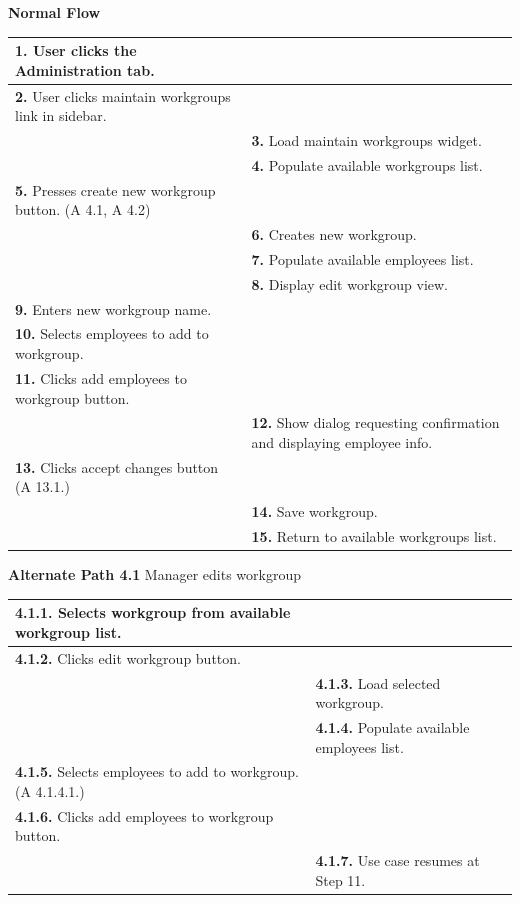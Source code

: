 \documentclass[letterpaper,12pt]{report}
\begin{document}
{ \centering \textbf{Normal Flow}
\begin{center}
\xuchead
\begin{tabular}{| p{8.5cm} | p{8.5cm} |}
\hline
\textbf{1.} User clicks the Administration tab. & \\
\hline
\textbf{2.} User clicks maintain workgroups link in sidebar. & \\
\hline
& \textbf{3.} Load maintain workgroups widget. \\
\hline
& \textbf{4.} Populate available workgroups list. \\
\hline
\textbf{5.} Presses create new workgroup button. (A 4.1, A 4.2) & \\
\hline
& \textbf{6.} Creates new workgroup. \\
\hline
& \textbf{7.} Populate available employees list. \\
\hline
& \textbf{8.} Display edit workgroup view. \\
\hline
\textbf{9.} Enters new workgroup name. \\
\hline
\textbf{10.} Selects employees to add to workgroup. & \\
\hline
\textbf{11.}  Clicks add employees to workgroup button. & \\
\hline
& \textbf{12.} Show dialog requesting confirmation and displaying employee info. \\
\hline
\textbf{13.} Clicks accept changes button (A 13.1.) & \\
\hline
& \textbf{14.} Save workgroup. \\
\hline
& \textbf{15.} Return to available workgroups list. \\
\hline
\end{tabular}
\end{center}

\pagebreak

\centering \textbf{Alternate Path 4.1}
\linebreak Manager edits workgroup
\begin{center}
\xuchead
\begin{tabular}{| p{8.5cm} | p{8.5cm} |}
\hline
\textbf{4.1.1.} Selects workgroup from available workgroup list. & \\
\hline
\textbf{4.1.2.} Clicks edit workgroup button. & \\
\hline
& \textbf{4.1.3.} Load selected workgroup. \\
\hline
& \textbf{4.1.4.} Populate available employees list. \\
\hline
\textbf{4.1.5.} Selects employees to add to workgroup. (A 4.1.4.1.) & \\
\hline
\textbf{4.1.6.} Clicks add employees to workgroup button. & \\
\hline
& \textbf{4.1.7.} Use case\index{Use Case} resumes at Step 11. \\
\hline
\end{tabular}
\end{center}

}
\end{document}

